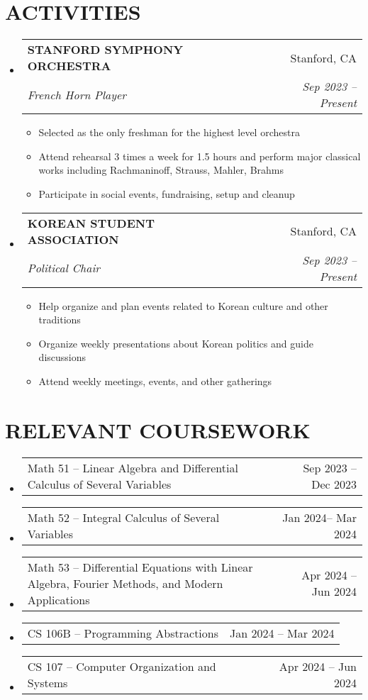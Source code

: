 \documentclass[letterpaper,11pt]{article}
\makeatletter
\newcommand{\resumeItem}[1]{
  \item\small{
    {#1 \vspace{-4pt}}
  }
}
\newcommand{\resumeSubheading}[4]{
  \vspace{-3pt}\item
    \begin{tabular*}{0.97\textwidth}[t]{l@{\extracolsep{\fill}}r}
      \vspace{-2pt}
      \textbf{#1} & \small#2 \\
      \textit{\small#3} & \textit{\small #4} \\
    \end{tabular*}\vspace{-10pt}
}
\newcommand{\resumeCourse}[2]{
  \vspace{-3pt}\item
    \begin{tabular*}{0.97\textwidth}[t]{l@{\extracolsep{\fill}}r}
      \vspace{-2pt}
      \small#1 & \small #2 \\
    \end{tabular*}\vspace{-8pt}
}
\newcommand{\resumeSubHeadingListStart}{\begin{itemize}[leftmargin=0in, label={}]}
\newcommand{\resumeSubHeadingListEnd}{\end{itemize}}
\newcommand{\resumeItemListStart}{\begin{itemize}[leftmargin=0.2in]}
\newcommand{\resumeItemListEnd}{\end{itemize}\vspace{-5pt}}
\makeatother
\begin{document}
  \section{\textbf{ACTIVITIES}}
  \resumeSubHeadingListStart

    \resumeSubheading
      {STANFORD SYMPHONY ORCHESTRA}{Stanford, CA}
      {French Horn Player}{Sep 2023 -- Present}
      \resumeItemListStart
      \resumeItem{Selected as the only freshman for the highest level orchestra}
      \resumeItem{Attend rehearsal 3 times a week for 1.5 hours and perform major classical works including Rachmaninoff, Strauss, Mahler, Brahms}
        \resumeItem{Participate in social events, fundraising, setup and cleanup}
      \resumeItemListEnd
      
    \resumeSubheading
      {KOREAN STUDENT ASSOCIATION}{Stanford, CA}
      {Political Chair}{Sep 2023 -- Present}
      \resumeItemListStart
        \resumeItem{Help organize and plan events related to Korean culture and other traditions}
        \resumeItem{Organize weekly presentations about Korean politics and guide discussions}
        \resumeItem{Attend weekly meetings, events, and other gatherings}
        \resumeItemListEnd
        \vspace{-2pt}
  \resumeSubHeadingListEnd

  \section{\textbf{RELEVANT COURSEWORK}}
  \resumeSubHeadingListStart
    \resumeCourse {Math 51 -- Linear Algebra and Differential Calculus of Several Variables}{Sep 2023 -- Dec 2023}
    \resumeCourse {Math 52 -- Integral Calculus of Several Variables}{Jan 2024-- Mar 2024}
    \resumeCourse {Math 53 -- Differential Equations with Linear Algebra, Fourier Methods, and Modern Applications}{Apr 2024 -- Jun 2024}
    \resumeCourse {CS 106B -- Programming Abstractions}{Jan 2024 -- Mar 2024}
    \resumeCourse {CS 107 -- Computer Organization and Systems}{Apr 2024 -- Jun 2024}
  \resumeSubHeadingListEnd

\end{document}
